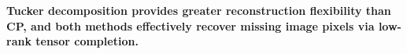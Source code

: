 \documentclass[final]{beamer}
\newcommand{\vsep}{\vspace{8pt}}
\begin{document}
\begin{frame}[t]
\vsep

\begin{tcolorbox}[sbox,
  colback=TitleBar!10, colframe=TitleBar,
  colbacktitle=TitleBar,
  top=48pt, bottom=48pt,
  title={7.\;\; Conclusion}
]
  \centering\fontsize{38}{48}\selectfont\bfseries\color{TitleBar}
  Tucker decomposition provides greater reconstruction flexibility than CP,
  and both methods effectively recover missing image pixels
  via low-rank tensor completion.
\end{tcolorbox}

\end{frame}
\end{document}
